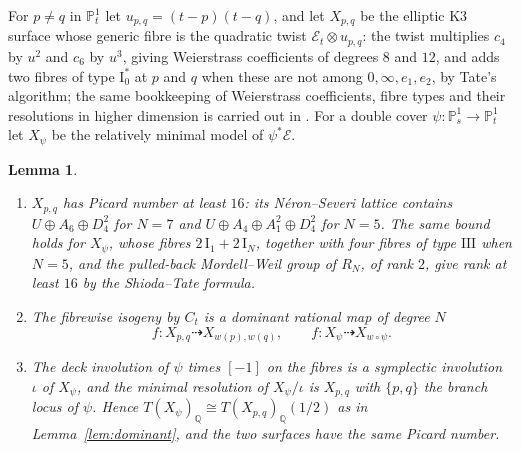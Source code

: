 \documentclass[11pt,reqno]{amsart}
\numberwithin{equation}{section}
\theoremstyle{plain}
\newtheorem{lemma}[theorem]{Lemma}
\theoremstyle{definition}
\newcommand{\QQ}{\mathbb{Q}}
\newcommand{\PP}{\mathbb{P}}
\begin{document}
For $p\ne q$ in $\PP^{1}_{t}$ let $u_{p,q}=(t-p)(t-q)$, and let $X_{p,q}$ be the elliptic K3 surface whose generic fibre is the quadratic twist $\mathcal{E}_{t}\otimes u_{p,q}$: the twist multiplies $c_{4}$ by $u^{2}$ and $c_{6}$ by $u^{3}$, giving Weierstrass coefficients of degrees $8$ and $12$, and adds two fibres of type $\mathrm{I}_{0}^{*}$ at $p$ and $q$ when these are not among $0,\infty,e_{1},e_{2}$, by Tate's algorithm; the same bookkeeping of Weierstrass coefficients, fibre types and their resolutions in higher dimension is carried out in \cite{Bha26b}. For a double cover $\psi\colon\PP^{1}_{s}\to\PP^{1}_{t}$ let $X_{\psi}$ be the relatively minimal model of $\psi^{*}\mathcal{E}$.

\begin{lemma}\label{lem:twists}
\leavevmode
\begin{enumerate}[label=\textup{(\roman*)},leftmargin=2.4em,itemsep=2pt]
\item $X_{p,q}$ has Picard number at least $16$: its Néron--Severi lattice contains $U\oplus A_{6}\oplus D_{4}^{2}$ for $N=7$ and $U\oplus A_{4}\oplus A_{1}^{2}\oplus D_{4}^{2}$ for $N=5$. The same bound holds for $X_{\psi}$, whose fibres $2\,\mathrm{I}_{1}+2\,\mathrm{I}_{N}$, together with four fibres of type $\mathrm{III}$ when $N=5$, and the pulled-back Mordell--Weil group of $R_{N}$, of rank $2$, give rank at least $16$ by the Shioda--Tate formula.
\item The fibrewise isogeny by $C_{t}$ is a dominant rational map of degree $N$
\[
f\colon X_{p,q}\dashrightarrow X_{w(p),w(q)},\qquad f\colon X_{\psi}\dashrightarrow X_{w\circ\psi}.
\]
\item The deck involution of $\psi$ times $[-1]$ on the fibres is a symplectic involution $\iota$ of $X_{\psi}$, and the minimal resolution of $X_{\psi}/\iota$ is $X_{p,q}$ with $\{p,q\}$ the branch locus of $\psi$. Hence $T(X_{\psi})_{\QQ}\cong T(X_{p,q})_{\QQ}(1/2)$ as in Lemma~\ref{lem:dominant}, and the two surfaces have the same Picard number.
\end{enumerate}
\end{lemma}
\end{document}
